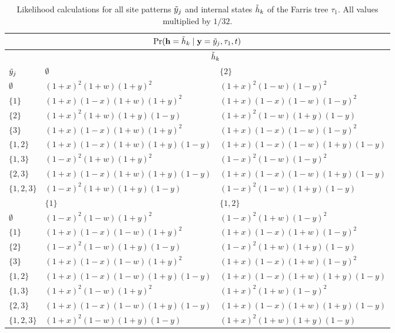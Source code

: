 \begin{table}
\centering
\begin{tabular}{|l|ll|}
\multicolumn{3}{c}{$\Pr(\mathbf{h}=\tilde{h}_k\mid \mathbf{y}=\tilde{y}_j,\tau_1,t)$}\\
\hline
& \multicolumn{2}{|c|}{$\tilde{h}_k$}\\
    \hline
    $\tilde{y}_j$    &$\emptyset$                                &$\{2\}$  \\
    \hline
     $\emptyset$   &$(1+x)^2   (1+w)(1+y)^2$          &$(1+x)^2   (1-w)(1-y)^2$\\
     $\{1\}$       &$(1+x)(1-x)(1+w)(1+y)^2$          &$(1+x)(1-x)(1-w)(1-y)^2$\\
     $\{2\}$       &$(1+x)^2   (1+w)(1+y)(1-y)$       &$(1+x)^2   (1-w)(1+y)(1-y)$\\
     $\{3\}$       &$(1+x)(1-x)(1+w)(1+y)^2$          &$(1+x)(1-x)(1-w)(1-y)^2$\\
     $\{1,2\}$     &$(1+x)(1-x)(1+w)(1+y)(1-y)$       &$(1+x)(1-x)(1-w)(1+y)(1-y)$\\
     $\{1,3\}$     &$(1-x)^2   (1+w)(1+y)^2$          &$(1-x)^2   (1-w)(1-y)^2$\\
     $\{2,3\}$     &$(1+x)(1-x)(1+w)(1+y)(1-y)$       &$(1+x)(1-x)(1-w)(1+y)(1-y)$\\
     $\{1,2,3\}$   &$(1-x)^2   (1+w)(1+y)(1-y)$       &$(1-x)^2   (1-w)(1+y)(1-y)$\\
    \hline
    \hline
    &$\{1\}$                             &$\{1,2\}$  \\
    \hline
     $\emptyset$   &$(1-x)^2   (1-w)(1+y)^2$     &$(1-x)^2   (1+w)(1-y)^2$\\
     $\{1\}$       &$(1+x)(1-x)(1-w)(1+y)^2$     &$(1+x)(1-x)(1+w)(1-y)^2$\\
     $\{2\}$       &$(1-x)^2   (1-w)(1+y)(1-y)$  &$(1-x)^2   (1+w)(1+y)(1-y)$\\
     $\{3\}$       &$(1+x)(1-x)(1-w)(1+y)^2$     &$(1+x)(1-x)(1+w)(1-y)^2$\\
     $\{1,2\}$     &$(1+x)(1-x)(1-w)(1+y)(1-y)$  &$(1+x)(1-x)(1+w)(1+y)(1-y)$\\
     $\{1,3\}$     &$(1+x)^2   (1-w)(1+y)^2$     &$(1+x)^2   (1+w)(1-y)^2$\\
     $\{2,3\}$     &$(1+x)(1-x)(1-w)(1+y)(1-y)$  &$(1+x)(1-x)(1+w)(1+y)(1-y)$\\
     $\{1,2,3\}$   &$(1+x)^2   (1-w)(1+y)(1-y)$  &$(1+x)^2   (1+w)(1+y)(1-y)$\\
    \hline
\end{tabular}
\caption{Likelihood calculations for all site patterns $\tilde{y}_j$ and internal states $\tilde{h}_k$ of the Farris tree $\tau_1$.
All values multiplied by $1/32$.}
\label{tab:farris_likelihoods}
\end{table}

